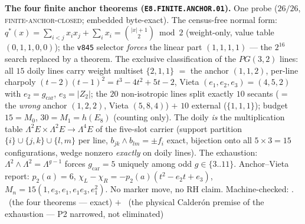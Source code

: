 \documentclass[11pt,a4paper]{article}
\newcommand{\gcar}{g_{\mathrm{car}}}
\theoremstyle{definition}
\begin{document}
\par\smallskip\noindent\textbf{The four finite anchor theorems
(\texttt{E8.FINITE.\allowbreak ANCHOR.01}).}
One probe ($26/26$, \textsc{finite-anchor-closed}; embedded
byte-exact).  The census-free normal form: $q^{*}(x) = \sum_{i<j}
x_i x_j + \sum_i x_i = \binom{|x|+1}{2} \bmod 2$ (weight-only,
value table $(0,1,1,0,0)$); the \texttt{v845} selector
\emph{forces} the linear part $(1,1,1,1)$ --- the $2^{16}$ search
replaced by a theorem.  The exclusive classification of the
$PG(3,2)$ lines: all $15$ doily lines carry weight multiset
$\{2,1,1\}$ $=$ the anchor $(1,1,2)$, per-line charpoly
$(t-2)(t-1)^2 = t^3 - 4t^2 + 5t - 2$, Vieta $(e_1,e_2,e_3) =
(4,5,2)$ with $e_2 = \gcar$, $e_3 = |Z_2|$; the $20$
non-isotropic lines split exactly $10$ secants ($=$ the
\emph{wrong} anchor $(1,2,2)$, Vieta $(5,8,4)$) $+$ $10$ external
($\{1,1,1\}$); budget $15 = M_0$, $30 = M_1 = h(E_8)$ (counting
only).  The doily \emph{is} the multiplication table $\Lambda^2 E
\times \Lambda^2 E \to \Lambda^4 E$ of the five-slot carrier
(support partition $\{i\} \cup \{j,k\} \cup \{l,m\}$ per line,
$b_{jk} \wedge b_{lm} = \pm f_i$ exact, bijection onto all
$5\times3 = 15$ configurations, wedge nonzero \emph{exactly} on
doily lines).  The exhaustion: $\Lambda^2 \wedge \Lambda^2 =
\Lambda^{g-1}$ forces $\gcar = 5$ uniquely among odd $g \in
\{3..11\}$.  Anchor--Vieta report: $p_2(a) = 6$, $\chi_L -
\chi_R = -p_2(a)(t^2 - e_2 t + e_3)$, $M_n = 15(1, e_3, e_1,
e_1 e_3, e_1^2)$.  No marker move, no RH claim.
Machine-checked: .
\mE\ (the four theorems --- exact) $+$ \mO\ (the physical
Calder\'on premise of the exhaustion --- P2 narrowed, not
eliminated)
\par\smallskip
\end{document}
